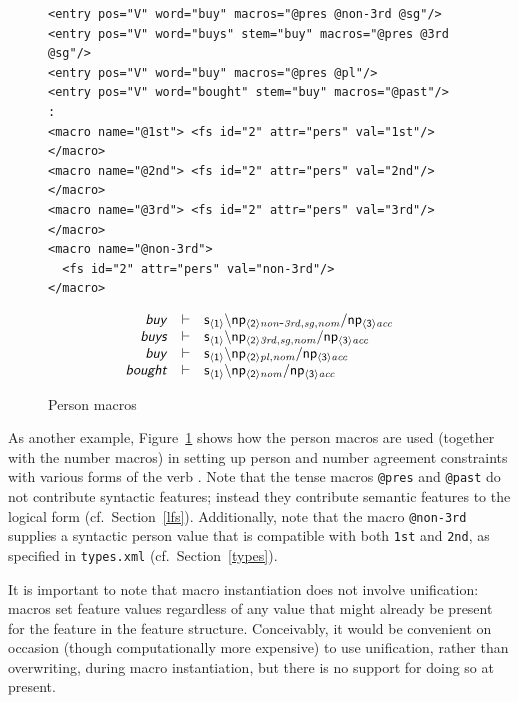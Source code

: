 \documentclass[11pt]{article}
\begin{document}
\begin{figure}
\begin{small}
\begin{verbatim}
<entry pos="V" word="buy" macros="@pres @non-3rd @sg"/>
<entry pos="V" word="buys" stem="buy" macros="@pres @3rd @sg"/>
<entry pos="V" word="buy" macros="@pres @pl"/>
<entry pos="V" word="bought" stem="buy" macros="@past"/>
:
<macro name="@1st"> <fs id="2" attr="pers" val="1st"/> </macro>
<macro name="@2nd"> <fs id="2" attr="pers" val="2nd"/> </macro>
<macro name="@3rd"> <fs id="2" attr="pers" val="3rd"/> </macro>
<macro name="@non-3rd"> 
  <fs id="2" attr="pers" val="non-3rd"/> 
</macro>
\end{verbatim}
\end{small}
\[
\begin{array}{rcl}
\textsf{\textsl{buy}} & \vdash & 
\mathsf{s_{\langle1\rangle\mathit{}}} \backslash \mathsf{np_{\langle2\rangle\mathit{non\mbox{-}3rd,sg,nom}}} / \mathsf{np_{\langle3\rangle\mathit{acc}}} \\ 
\textsf{\textsl{buys}} & \vdash & 
\mathsf{s_{\langle1\rangle\mathit{}}} \backslash \mathsf{np_{\langle2\rangle\mathit{3rd,sg,nom}}} / \mathsf{np_{\langle3\rangle\mathit{acc}}} \\
\textsf{\textsl{buy}} & \vdash & 
\mathsf{s_{\langle1\rangle\mathit{}}} \backslash \mathsf{np_{\langle2\rangle\mathit{pl,nom}}} / \mathsf{np_{\langle3\rangle\mathit{acc}}} \\ 
\textsf{\textsl{bought}} & \vdash & 
\mathsf{s_{\langle1\rangle\mathit{}}} \backslash \mathsf{np_{\langle2\rangle\mathit{nom}}} / \mathsf{np_{\langle3\rangle\mathit{acc}}} \\ 
\end{array} 
\]
\caption{Person macros}
\label{pers-macros}
\end{figure}

As another example, Figure~\ref{pers-macros} shows how the person macros
are used (together with the number macros) in setting up person and
number agreement constraints with various forms of the verb .
Note that the tense macros \texttt{@pres} and \texttt{@past} do not
contribute syntactic features; instead they contribute semantic features
to the logical form (cf.\ Section~\ref{lfs}). Additionally, note that
the macro \texttt{@non-3rd} supplies a syntactic person value that is
compatible with both \texttt{1st} and \texttt{2nd}, as specified in
\texttt{types.xml} (cf.\ Section~\ref{types}).

It is important to note that macro instantiation does not involve
unification: macros set feature values regardless of any value that
might already be present for the feature in the feature structure.
Conceivably, it would be convenient on occasion (though computationally 
more expensive) to use unification, rather than overwriting, during
macro instantiation, but there is no support for doing so at present.
\end{document}
